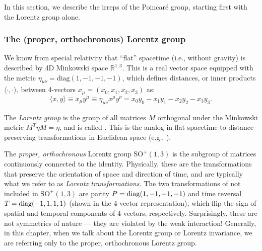 In this section, we describe the irreps of the Poincaré group, starting first with the Lorentz group alone.


\subsubsection{The (proper, orthochronous) Lorentz group}

We know from special relativity that ``flat'' spacetime (i.e., without gravity) is described by 4D Minkowski space $\mathbb R^{1, 3}$.
This is a real vector space equipped with the metric $\eta_{\mu\nu} = \mathrm{diag}(1, -1, -1, -1)$, which defines distances, or inner products $\langle \cdot, \cdot \rangle$, between 4-vectors $x_\mu = (x_0, x_1, x_2, x_3)$ as:
\begin{equation}
	\label{eq:01_minkowski_metric}
	\langle x, y \rangle \equiv x_\mu y^\mu \equiv \eta_{\mu\nu}x^\mu y^\nu = x_0 y_0 - x_1 y_1 - x_2 y_2 - x_3 y_3.
\end{equation}

\begin{definition}
\label{def:01_lorentz_group}
The \textit{Lorentz group} is the group of all matrices $M$ orthogonal under the Minkowski metric $M^T\eta M = \eta$, and is called \OO[1, 3].
This is the analog in flat spacetime to distance-preserving transformations in Euclidean space (e.g., \OO[3]).
\end{definition}

\begin{definition}
\label{def:01_proper_orthochronous}
The \textit{proper, orthochronous} Lorentz group $\mathrm{SO}^+(1, 3)$ is the subgroup of \OO[1, 3] matrices continuously connected to the identity.
Physically, these are the transformations that preserve the orientation of space and direction of time, and are typically what we refer to as \textit{Lorentz transformations}.
The two transformations of \OO[1, 3] not included in $\mathrm{SO}^+(1, 3)$ are parity $P = \mathrm{diag}(1, -1, -1, -1)$ and time reversal $T = \mathrm{diag}(-1, 1, 1, 1)$ (shown in the 4-vector representation), which flip the sign of spatial and temporal components of 4-vectors, respectively.
Surprisingly, these are not symmetries of nature ---
they are violated by the weak interaction!
Generally, in this chapter, when we talk about the Lorentz group or Lorentz invariance, we are referring only to the proper, orthochronous Lorentz group.
\end{definition}

